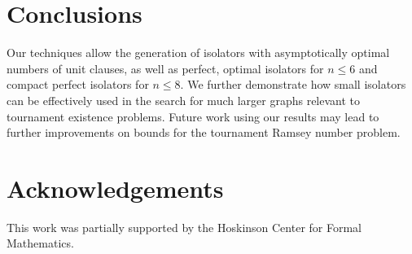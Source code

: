\documentclass[conference]{IEEEtran}
\begin{document}
\section{Conclusions}

Our techniques allow the generation of isolators with asymptotically optimal numbers of unit clauses, as well as perfect, optimal isolators for $n \le 6$ and compact perfect isolators for $n\le 8$. We further demonstrate how small isolators can be effectively used in the search for much larger graphs relevant to tournament existence problems. Future work using our results may lead to further improvements on bounds for the tournament Ramsey number problem.

\section{Acknowledgements}

This work was partially supported by the Hoskinson Center for Formal Mathematics.






\end{document}
